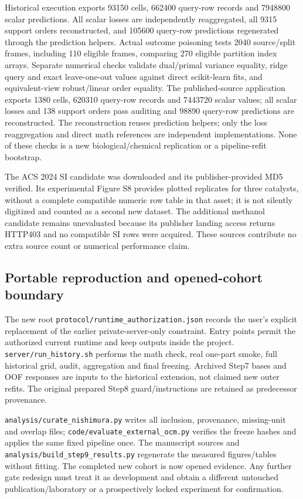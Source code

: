 Historical execution exports 93150 cells, 662400 query-row records and 7948800 scalar predictions. All scalar losses are independently reaggregated, all 9315 support orders reconstructed, and 105600 query-row predictions regenerated through the prediction helpers. Actual outcome poisoning tests 2040 source/split frames, including 110 eligible frames, comparing 270 eligible partition index arrays. Separate numerical checks validate dual/primal variance equality, ridge query and exact leave-one-out values against direct scikit-learn fits, and equivalent-view robust/linear order equality. The published-source application exports 1380 cells, 620310 query-row records and 7443720 scalar values; all scalar losses and 138 support orders pass auditing and 98890 query-row predictions are reconstructed. The reconstruction reuses prediction helpers; only the loss reaggregation and direct math references are independent implementations. None of these checks is a new biological/chemical replication or a pipeline-refit bootstrap.

The ACS 2024 SI candidate was downloaded and its publisher-provided MD5 verified. Its experimental Figure S8 provides plotted replicates for three catalysts, without a complete compatible numeric row table in that asset; it is not silently digitized and counted as a second new dataset. The additional methanol candidate remains unevaluated because its publisher landing access returns HTTP403 and no compatible SI rows were acquired. These sources contribute no extra source count or numerical performance claim.

\subsection{Portable reproduction and opened-cohort boundary}
The new root \texttt{protocol/runtime\_authorization.json} records the user's explicit replacement of the earlier private-server-only constraint. Entry points permit the authorized current runtime and keep outputs inside the project. \texttt{server/run\_history.sh} performs the math check, real one-part smoke, full historical grid, audit, aggregation and final freezing. Archived Step7 bases and OOF responses are inputs to the historical extension, not claimed new outer refits. The original prepared Step8 guard/instructions are retained as predecessor provenance.

\texttt{analysis/curate\_nishimura.py} writes all inclusion, provenance, missing-unit and overlap files; \texttt{code/evaluate\_external\_ocm.py} verifies the freeze hashes and applies the same fixed pipeline once. The manuscript sources and \texttt{analysis/build\_step9\_results.py} regenerate the measured figures/tables without fitting. The completed new cohort is now opened evidence. Any further gate redesign must treat it as development and obtain a different untouched publication/laboratory or a prospectively locked experiment for confirmation.
